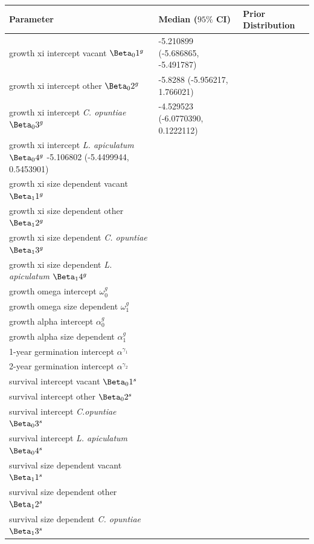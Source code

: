 \documentclass[11pt]{article}\usepackage[sc]{mathpazo} %
\begin{document}
  \begin{table}[]
  \begin{tabular}{l|l|l}
    \textbf{Parameter} & \textbf{Median ($95\%$ CI)} & \textbf{Prior Distribution} \\
    \hline
    growth xi intercept vacant $\Beta_01^g$ & -5.210899 (-5.686865, -5.491787) & \\
    growth xi intercept other $\Beta_02^g$ & -5.8288 (-5.956217, 1.766021) & \\
    growth xi intercept \textit{C. opuntiae} $\Beta_03^g$ & -4.529523 (-6.0770390, 0.1222112) & \\
    growth xi intercept \textit{L. apiculatum} $\Beta_04^g$ -5.106802 (-5.4499944, 0.5453901) & \\
    growth xi size dependent vacant $\Beta_11^g$ & & \\
    growth xi size dependent other $\Beta_12^g$ & & \\
    growth xi size dependent \textit{C. opuntiae} $\Beta_13^g$ & & \\
    growth xi size dependent \textit{L. apiculatum} $\Beta_14^g$ & & \\
    growth omega intercept $\omega_0^g$ & & \\
    growth omega size dependent $\omega_1^g$ & & \\
    growth alpha intercept $\alpha_0^g$ & & \\
    growth alpha size dependent $\alpha_1^g$ & & \\
    \hline
    1-year germination intercept $\alpha^{\gamma_1}$ & & \\
    2-year germination intercept $\alpha^{\gamma_2}$ & & \\
    \hline
    survival intercept vacant $\Beta_01^s$ & & \\
    survival intercept other $\Beta_02^s$ & & \\
    survival intercept \textit{C.opuntiae} $\Beta_03^s$ & & \\
    survival intercept \textit{L. apiculatum} $\Beta_04^s$ & & \\
    survival size dependent vacant $\Beta_11^s$ & & \\
    survival size dependent other $\Beta_12^s$ & & \\
    survival size dependent \textit{C. opuntiae} $\Beta_13^s$ & & \\

\end{tabular}
\end{table}
\end{document}
